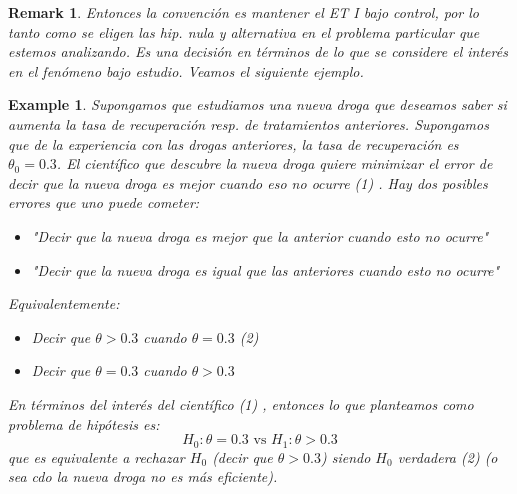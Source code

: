 \documentclass{article}
\theoremstyle{remarkstyle}
\newtheorem*{remark}{Remark}
\theoremstyle{examplestyle}
\newtheorem*{example}{Example}
\theoremstyle{definitionstyle}
\theoremstyle{lemmastyle}
\theoremstyle{theoremstyle}
\begin{document}

\begin{remark}
Entonces la convención es mantener el ET I bajo control, por lo tanto como se eligen las hip. nula y alternativa en el problema particular que estemos analizando. Es una decisión en términos de lo que se considere el interés en el fenómeno bajo estudio. Veamos el siguiente ejemplo.
\end{remark}

\begin{example}
Supongamos que estudiamos una nueva droga que deseamos saber si aumenta la tasa de recuperación resp. de tratamientos anteriores. Supongamos que de la experiencia con las drogas anteriores, la tasa de recuperación es $\theta_0 = 0.3$.
El científico que descubre la nueva droga quiere minimizar el error de decir que la nueva droga es mejor cuando eso no ocurre (1) .
Hay dos posibles errores que uno puede cometer:
\begin{itemize}
    \item "Decir que la nueva droga es mejor que la anterior cuando esto no ocurre"
    \item "Decir que la nueva droga es igual que las anteriores cuando esto no ocurre"
\end{itemize}

Equivalentemente:
\begin{itemize}
    \item Decir que $\theta > 0.3$ cuando $\theta = 0.3$ (2)
    \item Decir que $\theta = 0.3$ cuando $\theta > 0.3$
\end{itemize}

En términos del interés del científico (1) , entonces lo que planteamos como problema de hipótesis es:
\[H_0: \theta=0.3 \text{ vs } H_1: \theta>0.3\]
que es equivalente a rechazar $H_0$ (decir que $\theta > 0.3$) siendo $H_0$ verdadera (2) (o sea cdo la nueva droga no es más eficiente).


\end{example}
\end{document}
